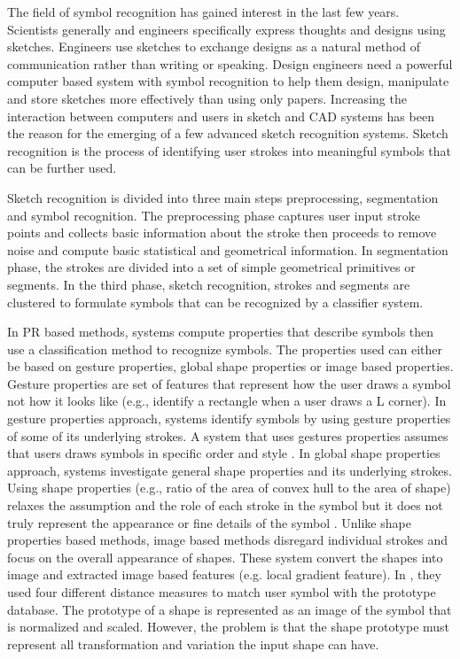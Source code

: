 \documentclass[preprint,1p,times,review]{elsarticle}
\begin{document}
 The field of symbol recognition has gained interest in the last few years. Scientists generally and engineers specifically express thoughts and designs using sketches. Engineers use sketches to exchange designs as a natural method of communication rather than writing or speaking. Design engineers need a powerful computer based system with symbol recognition to help them design, manipulate and store sketches more effectively than using only papers. Increasing the interaction between computers and users in sketch and CAD systems has been the reason for the emerging of a few advanced sketch recognition systems. Sketch recognition is the process of identifying user strokes into meaningful symbols that can be further used. 

 Sketch recognition is divided into three main steps preprocessing, segmentation and symbol recognition. The preprocessing phase captures user input stroke points and collects basic information about the stroke then proceeds to remove noise and compute basic statistical and geometrical information. In segmentation phase, the strokes are divided into a set of simple geometrical primitives or segments. In the third phase, sketch recognition, strokes and segments are clustered to formulate symbols that can be recognized by a classifier system.



In PR based methods, systems compute properties that describe symbols then use a classification method to recognize symbols. The properties used can either be based on gesture properties, global shape properties or image based properties. Gesture properties are set of features that represent how the user draws a symbol not how it looks like (e.g., identify a rectangle when a user draws a L corner). In gesture properties approach, systems identify symbols by using gesture properties of some of its underlying strokes. A system that uses gestures properties assumes that users draws symbols in specific order and style \cite{gestureexample12,aideddesgin22}. In global shape properties approach, systems investigate general shape properties and its underlying strokes. Using shape properties (e.g., ratio of the area of convex hull to the area of shape) relaxes the assumption and the role of each stroke in the symbol but it does not truly represent the appearance or fine details of the symbol \cite{DiagramOfflineConvexHull,Cali63}. Unlike shape properties based methods, image based methods disregard individual strokes and focus on the overall appearance of shapes. These system convert the shapes into image and extracted image based features (e.g. local gradient feature)\cite{Oltmans07,imagetrainable48}. In \cite{imagetrainable48}, they used four different distance measures to match user symbol with the prototype database. The prototype of a shape is represented as an image of the symbol that is normalized and scaled.  However, the problem is that the shape prototype must represent all transformation and variation the input shape can have.   %
\end{document}
